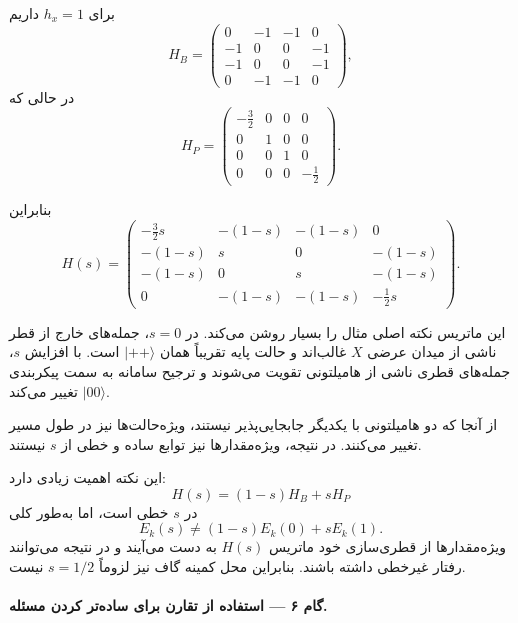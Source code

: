 برای $h_x=1$ داریم
\begin{equation}
	H_B=
	\begin{pmatrix}
		0&-1&-1&0\\
		-1&0&0&-1\\
		-1&0&0&-1\\
		0&-1&-1&0
	\end{pmatrix},
\end{equation}
در حالی که
\begin{equation}
	H_P=
	\begin{pmatrix}
		-\frac32&0&0&0\\
		0&1&0&0\\
		0&0&1&0\\
		0&0&0&-\frac12
	\end{pmatrix}.
\end{equation}

بنابراین
\begin{equation}
	\label{eq:Hs-explicit-example}
	H(s)=
	\begin{pmatrix}
		-\frac32s&-(1-s)&-(1-s)&0\\
		-(1-s)&s&0&-(1-s)\\
		-(1-s)&0&s&-(1-s)\\
		0&-(1-s)&-(1-s)&-\frac12s
	\end{pmatrix}.
\end{equation}

این ماتریس نکته اصلی مثال را بسیار روشن می‌کند. در $s=0$، جمله‌های خارج از قطر ناشی از میدان عرضی $X$ غالب‌اند و حالت پایه تقریباً همان $\lvert++\rangle$ است. با افزایش $s$، جمله‌های قطری ناشی از هامیلتونی  تقویت می‌شوند و ترجیح سامانه به سمت پیکربندی $\lvert00\rangle$ تغییر می‌کند.

از آنجا که دو هامیلتونی با یکدیگر جابجایی‌پذیر نیستند، ویژه‌حالت‌ها نیز در طول مسیر تغییر می‌کنند. در نتیجه، ویژه‌مقدارها نیز توابع ساده و خطی از $s$ نیستند.

این نکته اهمیت زیادی دارد:
\begin{equation}
	H(s)=(1-s)H_B+sH_P
\end{equation}
در $s$ خطی است، اما به‌طور کلی
\begin{equation}
	E_k(s)\neq(1-s)E_k(0)+sE_k(1).
\end{equation}
ویژه‌مقدارها از قطری‌سازی خود ماتریس $H(s)$ به دست می‌آیند و در نتیجه می‌توانند رفتار غیرخطی داشته باشند. بنابراین محل کمینه گاف نیز لزوماً $s=1/2$ نیست.

\paragraph{گام ۶ --- استفاده از تقارن برای ساده‌تر کردن مسئله.}

